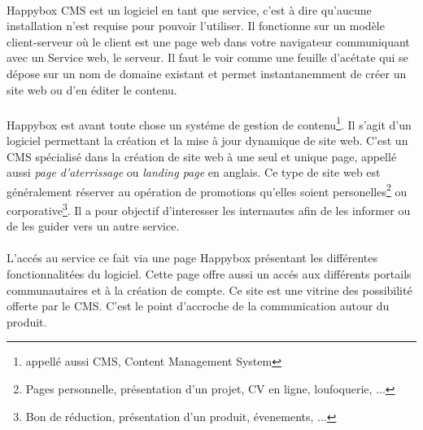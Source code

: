 \documentclass[11pt, a4paper ]{article}
\begin{document}
\begin{spacing}{1.5}
\paragraph{}
Happybox CMS est un logiciel en tant que service, c'est à dire qu'aucune installation n'est requise pour pouvoir l'utiliser. Il fonctionne sur un modèle client-serveur où le client est une page web dans votre navigateur communiquant avec un Service web, le serveur. Il faut le voir comme une feuille d'acétate qui se dépose sur un nom de domaine existant et permet instantanemment de créer un site web ou d'en éditer le contenu. 

	\paragraph{}
Happybox est avant toute chose un systéme de gestion de contenu\footnote{appellé aussi CMS, Content Management System}. Il s'agit d'un logiciel permettant la création et la mise à jour dynamique de site web.
C'est un CMS spécialisé dans la création de site web à une seul et unique page, appellé aussi \emph{page d'aterrissage} ou \emph{landing page} en anglais. Ce type de site web est généralement réserver au opération de promotions qu'elles soient personelles\footnote{Pages personnelle, présentation d'un projet, CV en ligne, loufoquerie, ...} ou corporative\footnote{Bon de réduction, présentation d'un produit, évenements, ...}. Il a pour objectif d'interesser les internautes afin de les informer ou de les guider vers un autre service.



\paragraph{}
L'accés au service ce fait via une page Happybox présentant les différentes fonctionnalitées du logiciel. Cette page offre aussi un accés aux différents portails communautaires et à la création de compte. Ce site est une vitrine des possibilité offerte par le CMS. C'est le point d'accroche de la communication autour du produit.


\end{spacing}
\end{document}
